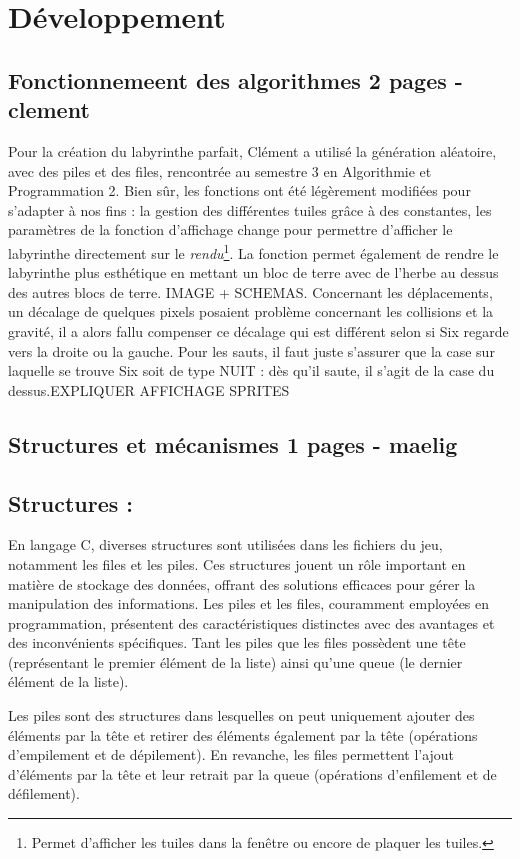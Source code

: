 \documentclass[10pt]{article}
\begin{document}
\section{Développement}
   \subsection{Fonctionnemeent des algorithmes 2 pages - clement}
   Pour la création du labyrinthe parfait, Clément a utilisé la génération aléatoire, avec des piles et des files, rencontrée au semestre 3 en Algorithmie et Programmation 2.
   Bien sûr, les fonctions ont été légèrement modifiées pour s'adapter à nos fins : la gestion des différentes tuiles grâce à des constantes, les 
   paramètres de la fonction d'affichage change pour permettre d'afficher le labyrinthe directement sur le \textit{rendu}\footnote{
   Permet d'afficher les tuiles dans la fenêtre ou encore de plaquer les tuiles.}. La fonction permet également de rendre le labyrinthe plus esthétique
   en mettant un bloc de terre avec de l'herbe au dessus des autres blocs de terre. IMAGE + SCHEMAS. Concernant les déplacements, un décalage de quelques
   pixels posaient problème concernant les collisions et la gravité, il a alors fallu compenser ce décalage qui est différent selon si Six regarde vers
   la droite ou la gauche. Pour les sauts, il faut juste s'assurer que la case sur laquelle se trouve Six soit de type NUIT : dès qu'il saute, il s'agit
   de la case du dessus.EXPLIQUER AFFICHAGE SPRITES
   \subsection{Structures et mécanismes 1 pages - maelig}
   \subsection{Structures :}

En langage C, diverses structures sont utilisées dans les fichiers du jeu, notamment les files et les piles. Ces structures jouent un rôle important en matière de stockage des données, offrant des solutions efficaces pour gérer la manipulation des informations. Les piles et les files, couramment employées en programmation, présentent des caractéristiques distinctes avec des avantages et des inconvénients spécifiques. Tant les piles que les files possèdent une tête (représentant le premier élément de la liste) ainsi qu'une queue (le dernier élément de la liste).

Les piles sont des structures dans lesquelles on peut uniquement ajouter des éléments par la tête et retirer des éléments également par la tête (opérations d'empilement et de dépilement). En revanche, les files permettent l'ajout d'éléments par la tête et leur retrait par la queue (opérations d'enfilement et de défilement).
\end{document}

